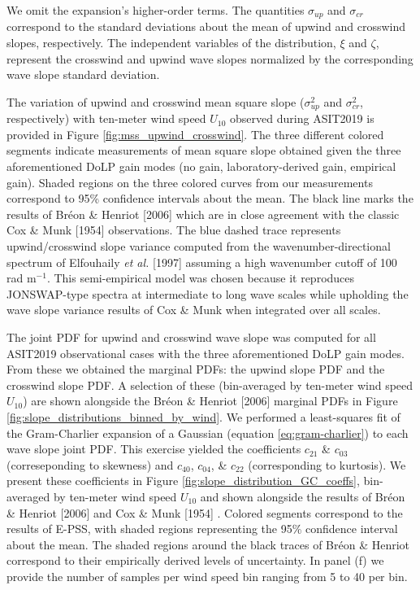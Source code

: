 \documentclass[letterpaper,journal]{IEEEtran}
\begin{document}
We omit the expansion's higher-order terms. The quantities $\sigma_{up}$ and $\sigma_{cr}$ correspond to the standard deviations about the mean of upwind and crosswind slopes, respectively. The independent variables of the distribution, $\xi$ and $\zeta$, represent the crosswind and upwind wave slopes normalized by the corresponding wave slope standard deviation.

The variation of upwind and crosswind mean square slope ($\sigma_{up}^2$ and $\sigma_{cr}^2$, respectively) with ten-meter wind speed $U_{10}$ observed during ASIT2019 is provided in Figure \ref{fig:mss_upwind_crosswind}. The three different colored segments indicate measurements of mean square slope obtained given the three aforementioned DoLP gain modes (no gain, laboratory-derived gain, empirical gain). Shaded regions on the three colored curves from our measurements correspond to 95\% confidence intervals about the mean. The black line marks the results of Br\'eon \& Henriot [2006] \cite{Breon2006} which are in close agreement with the classic Cox \& Munk [1954] \cite{Cox1954a} observations. The blue dashed trace represents upwind/crosswind slope variance computed from the wavenumber-directional spectrum of Elfouhaily \emph{et al.} [1997] assuming a high wavenumber cutoff of 100 rad m$^{-1}$. This semi-empirical model \cite{Elfouhaily1997} was chosen because it reproduces JONSWAP-type spectra \cite{Hasselmann1973} at intermediate to long wave scales while upholding the wave slope variance results of Cox \& Munk \cite{Cox1954a} when integrated over all scales.

The joint PDF for upwind and crosswind wave slope was computed for all ASIT2019 observational cases with the three aforementioned DoLP gain modes. From these we obtained the marginal PDFs: the upwind slope PDF and the crosswind slope PDF. A selection of these (bin-averaged by ten-meter wind speed $U_{10}$) are shown alongside the Br\'eon \& Henriot [2006] \cite{Breon2006} marginal PDFs in Figure \ref{fig:slope_distributions_binned_by_wind}. We performed a least-squares fit of the Gram-Charlier expansion of a Gaussian (equation \ref{eq:gram-charlier}) to each wave slope joint PDF. This exercise yielded the coefficients $c_{21}$ \& $c_{03}$ (correseponding to skewness) and $c_{40}$, $c_{04}$, \& $c_{22}$ (corresponding to kurtosis). We present these coefficients in Figure \ref{fig:slope_distribution_GC_coeffs}, bin-averaged by ten-meter wind speed $U_{10}$ and shown alongside the results of Br\'eon \& Henriot [2006] \cite{Breon2006} and Cox \& Munk [1954] \cite{Cox1954a}. Colored segments correspond to the results of E-PSS, with shaded regions representing the 95\% confidence interval about the mean. The shaded regions around the black traces of Br\'eon \& Henriot correspond to their empirically derived levels of uncertainty. In panel (f) we provide the number of samples per wind speed bin ranging from 5 to 40 per bin.
\end{document}
